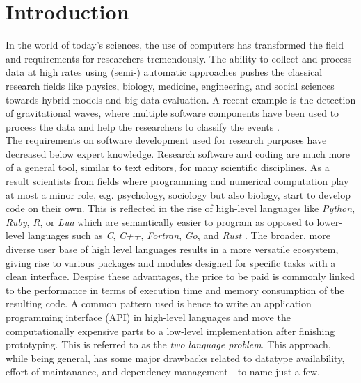 \section{Introduction}
\label{JM:sec:introduction}

In the world of today's sciences, the use of computers has transformed the field and requirements for researchers tremendously. 
The ability to collect and process data at high rates using (semi-) automatic approaches pushes the classical research fields like
physics, biology, medicine, engineering, and social sciences towards hybrid models and big data evaluation. A recent example is the detection of gravitational waves, 
where multiple software components have been used to process the data and help the researchers to classify the events \cite{JMMacleodEtAl2021} .\\


The requirements on software development used for research purposes have decreased below expert knowledge. Research software and coding are much more of a general tool, similar to text editors, for many scientific disciplines. 
As a result scientists from fields where programming and numerical computation play at most a minor role, e.g. psychology, sociology but also biology, start to develop code on their own.
This is reflected in the rise of high-level languages like \textit{Python}, \textit{Ruby}, \textit{R}, or \textit{Lua} \cite{JMVanRossumDrake2009,JMThomasEtAl2005, JMRCT2016, JMIerusalimschy2006} which are semantically easier to program as opposed to lower-level languages such as 
\textit{C}, \textit{C++}, \textit{Fortran}, \textit{Go}, and \textit{Rust} \cite{JMKernighanRitchie2006, JMStroustrup2013, JMBackusHeising1964, JMMeyerson2014, JMMatsakisKlockII2014}. 
The broader, more diverse user base of high level languages results in a more versatile ecosystem, giving rise to various packages and modules designed
for specific tasks with a clean interface. Despise these advantages, the price to be paid is commonly linked to the performance in terms of execution time and memory consumption of the resulting code. 
A common pattern used is hence to write an application programming interface (API) in high-level languages and move the computationally expensive parts to a low-level implementation after finishing prototyping. 
This is referred to as the \textit{two language problem}.
This approach, while being general, has some major drawbacks related to datatype availability, effort of maintanance, and dependency management - to name just a few.\\

